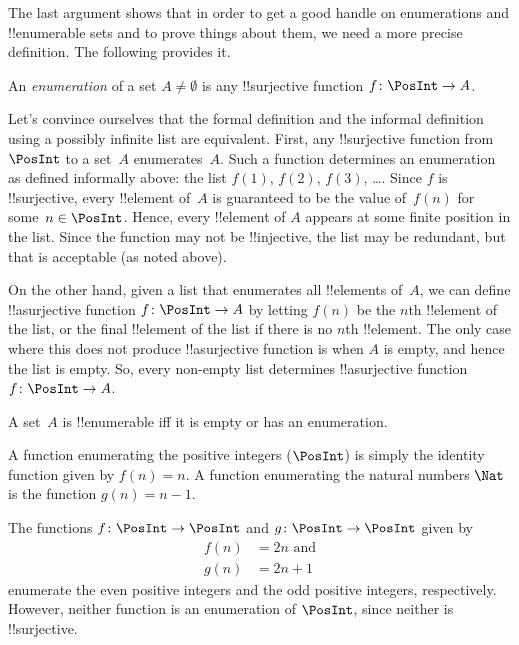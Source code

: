 \documentclass[../../../include/open-logic-section]{subfiles}
\begin{document}
The last argument shows that in order to get a good handle on
enumerations and !!{enumerable} sets and to prove things about them,
we need a more precise definition.  The following provides it.

\begin{defn} 
An \emph{enumeration} of a set $A \neq \emptyset$ is any
!!{surjective} function $f \colon \PosInt \to A$.
\end{defn}

\begin{explain}
Let's convince ourselves that the formal definition and the informal
definition using a possibly infinite list are equivalent. First, any
!!{surjective} function from $\PosInt$ to a set~$A$ enumerates~$A$.
Such a function determines an enumeration as defined informally above:
the list $f(1)$, $f(2)$, $f(3)$, \dots. Since $f$ is !!{surjective},
every !!{element} of~$A$ is guaranteed to be the value of~$f(n)$ for
some~$n \in \PosInt$. Hence, every !!{element} of $A$ appears at some
finite position in the list. Since the function may not be
!!{injective}, the list may be redundant, but that is acceptable (as
noted above).

On the other hand, given a list that enumerates all !!{element}s
of~$A$, we can define !!a{surjective} function $f\colon \PosInt \to A$
by letting $f(n)$ be the $n$th !!{element} of the list, or the final
!!{element} of the list if there is no $n$th !!{element}. The only
case where this does not produce !!a{surjective} function is when $A$ is
empty, and hence the list is empty. So, every non-empty list
determines !!a{surjective} function $f\colon \PosInt \to A$.
\end{explain}

\begin{defn}
  A set~$A$ is !!{enumerable} iff it is empty or has an enumeration.
\end{defn}

\begin{ex}
A function enumerating the positive integers ($\PosInt$) is simply the
identity function given by $f(n) = n$. A function enumerating the
natural numbers $\Nat$ is the function $g(n) = n - 1$.
\end{ex}

\begin{ex}
The functions $f\colon \PosInt \to \PosInt$ and $g \colon \PosInt \to
\PosInt$ given by
\begin{align*}
f(n) & = 2n \text{ and}\\
g(n) & = 2n+1
\end{align*}
enumerate the even positive integers and the odd positive integers,
respectively. However, neither function is an enumeration of
$\PosInt$, since neither is !!{surjective}.
\end{ex}
\end{document}
